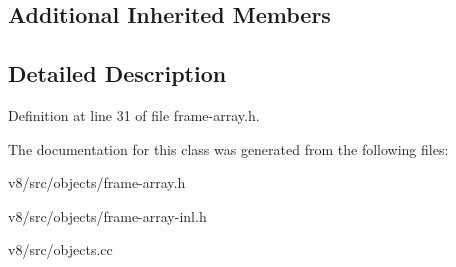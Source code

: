 \subsection*{Additional Inherited Members}


\subsection{Detailed Description}


Definition at line 31 of file frame-\/array.\+h.



The documentation for this class was generated from the following files\+:\begin{DoxyCompactItemize}
\item 
v8/src/objects/frame-\/array.\+h\item 
v8/src/objects/frame-\/array-\/inl.\+h\item 
v8/src/objects.\+cc\end{DoxyCompactItemize}
